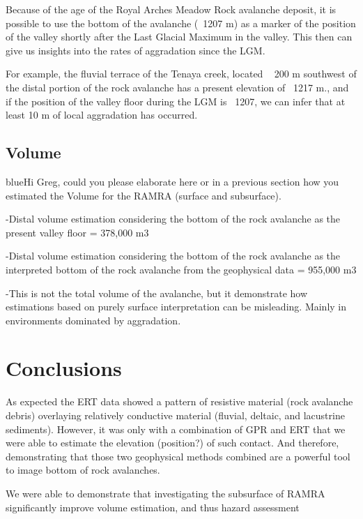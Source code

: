 \documentclass[utf8]{frontiersSCNS}
\newcommand{\COMON}{\begin{color}{blue}}
\newcommand{\COMOFF}{\end{color}}
\begin{document}
Because of the age of the Royal Arches Meadow Rock avalanche deposit, it is possible to use the bottom of the avalanche (~1207 m) as a marker of the position of the valley shortly after the Last Glacial Maximum in the valley. This then can give us insights into the rates of aggradation since the LGM. 

For example, the fluvial terrace of the Tenaya creek, located ~ 200 m southwest of the distal portion of the rock avalanche has a present elevation of ~1217 m., and if the position of the valley floor during the LGM is ~1207, we can infer that at least 10 m of local aggradation has occurred. 


\subsection{Volume}

\COMON Hi Greg, could you please elaborate here or in a previous section how you estimated the Volume for the RAMRA (surface and subsurface).
\COMOFF

-Distal volume estimation considering the bottom of the rock avalanche as the present valley floor =  378,000 m3

-Distal volume estimation considering the bottom of the rock avalanche as the interpreted bottom of the rock avalanche from the geophysical data = 955,000 m3 

-This is not the total volume of the avalanche, but it demonstrate how estimations based on purely surface interpretation can be misleading. Mainly in environments dominated by aggradation. 




\section{Conclusions}


As expected the ERT data showed a pattern of resistive material (rock avalanche debris) overlaying relatively conductive material (fluvial, deltaic, and lacustrine sediments). However, it was only with a combination of GPR and ERT that we were able to estimate the elevation (position?) of such contact. And therefore, demonstrating that those two geophysical methods combined are a powerful tool to image bottom of rock avalanches.  

We were able to demonstrate that investigating the subsurface of RAMRA significantly improve volume estimation, and thus hazard assessment 
     
\end{document}
